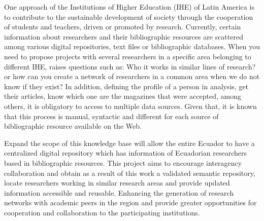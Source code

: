 \documentclass[11pt]{article}
\begin{document}
One approach of the Institutions of Higher Education (IHE) of Latin America is to contribute to the sustainable development of society through the cooperation of students and teachers, driven or promoted  by research. Currently, certain information about researchers and their bibliographic resources are scattered among various digital repositories, text files or bibliographic databases. When you need to propose projects with several researchers in a specific area belonging to different IHE, raises questions such as: Who it works in similar lines of research? or how can you create a network of researchers in a common area when we do not know if they exist? In addition, defining the profile of a person in analysis, get their articles, know which one are the magazines that were accepted, among others, it is obligatory to access to multiple data sources. Given that, it is known that this process is manual, syntactic and different for each source of bibliographic resource available on the Web.

Expand the scope of this knowledge base will allow the entire Ecuador to have a centralized digital repository which has information of Ecuadorian researchers based in bibliographic resources. This project aims to encourage interagency collaboration and obtain as a result of this work a validated semantic repository, locate researchers working in similar research areas and provide updated information accessible and reusable. Enhancing the generation of research networks with academic peers in the region and provide greater opportunities for cooperation and collaboration to the participating institutions.


\end{document}
